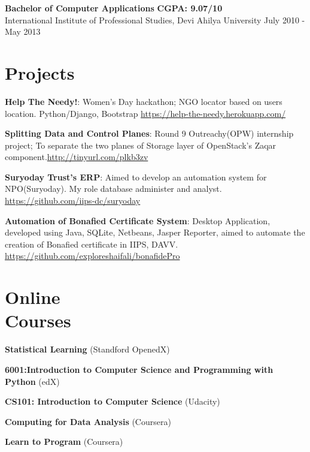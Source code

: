 \documentclass[margin,line]{resume}
\begin{document}
\begin{resume}
	\begin{list2}
	\item \textbf{Bachelor of Computer Applications} \hspace{70mm} \textbf{CGPA: 9.07/10} \\ International Institute of Professional Studies, Devi Ahilya University \hspace{20mm} July 2010 - May 2013
	\end{list2}

    \section{\mysidestyle Projects} 
	\begin{list2}

	\item \textbf{Help The Needy!}: Women's Day hackathon; NGO locator based on users location. Python/Django, Bootstrap \url{https://help-the-needy.herokuapp.com/}
    \item \textbf{Splitting Data and Control Planes}: Round 9 Outreachy(OPW) internship project; To separate the two planes of Storage layer of OpenStack's Zaqar component.\url{http://tinyurl.com/plkb3zv}
	\item \textbf{Suryoday Trust's ERP}: Aimed to develop an automation system for NPO(Suryoday). My role
    database administer and analyst. \url{https://github.com/iips-dc/suryoday}
	\item \textbf{Automation of Bonafied Certificate System}: Desktop Application, developed using Java,
    SQLite, Netbeans, Jasper Reporter, aimed to automate the creation of Bonafied certificate in IIPS, DAVV. \url{https://github.com/exploreshaifali/bonafidePro}
    \end{list2}

    \section{\mysidestyle Online \\ Courses}

    \begin{list2}
	\item \textbf{Statistical Learning} (Standford OpenedX)
	\item \textbf{6001:Introduction to Computer Science and Programming with Python} (edX)
	\item \textbf{CS101: Introduction to Computer Science} (Udacity)
	\item \textbf{Computing for Data Analysis} (Coursera)
    \item \textbf{Learn to Program} (Coursera)
	\end{list2}


\end{resume}
\end{document}
